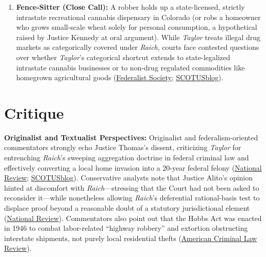 \documentclass[12pt]{article}
\begin{document}
\begin{enumerate}
\item \textbf{Fence-Sitter (Close Call):} A robber holds up a state-licensed, strictly intrastate recreational cannabis dispensary in Colorado (or robs a homeowner who grows small-scale wheat solely for personal consumption, a hypothetical raised by Justice Kennedy at oral argument). While \textit{Taylor} treats illegal drug markets as categorically covered under \textit{Raich}, courts face contested questions over whether \textit{Taylor}'s categorical shortcut extends to state-legalized intrastate cannabis businesses or to non-drug regulated commodities like homegrown agricultural goods (\href{https://fedsoc.org/commentary/fedsoc-blog/taylor-v-united-states}{Federalist Society}; \href{https://www.scotusblog.com/2025/10/the-case-that-made-federalism-go-up-in-smoke/}{SCOTUSblog}).
\end{enumerate}

\section{Critique}
\textbf{Originalist and Textualist Perspectives:} Originalist and federalism-oriented commentators strongly echo Justice Thomas's dissent, criticizing \textit{Taylor} for entrenching \textit{Raich}'s sweeping aggregation doctrine in federal criminal law and effectively converting a local home invasion into a 20-year federal felony (\href{https://www.nationalreview.com/bench-memos/loose-evidentiary-ends-raich-taylor-v-united-states}{National Review}; \href{https://www.scotusblog.com/2025/10/the-case-that-made-federalism-go-up-in-smoke/}{SCOTUSblog}). Conservative analysts note that Justice Alito's opinion hinted at discomfort with \textit{Raich}---stressing that the Court had not been asked to reconsider it---while nonetheless allowing \textit{Raich}'s deferential rational-basis test to displace proof beyond a reasonable doubt of a statutory jurisdictional element (\href{https://www.nationalreview.com/bench-memos/loose-evidentiary-ends-raich-taylor-v-united-states}{National Review}). Commentators also point out that the Hobbs Act was enacted in 1946 to combat labor-related ``highway robbery'' and extortion obstructing interstate shipments, not purely local residential thefts (\href{https://www.law.georgetown.edu/american-criminal-law-review/wp-content/uploads/sites/15/2023/02/53-0-Evola-you-shall-go-no-further.pdf}{American Criminal Law Review}).
\end{document}
